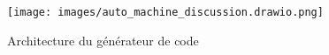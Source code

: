 
\begin{figure}
\centering
\texttt{[image: images/auto\_machine\_discussion.drawio.png]}
\caption{Architecture du générateur de code}
\label{fig:dia_auto_machine_discussion}
\end{figure}







